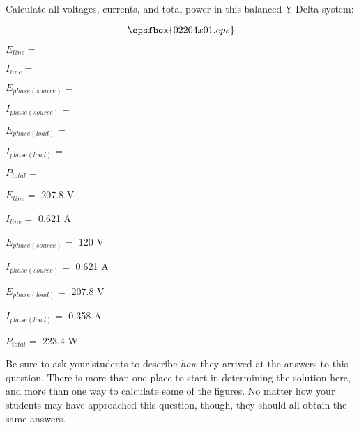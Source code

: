 

Calculate all voltages, currents, and total power in this balanced Y-Delta system:

$$\epsfbox{02204x01.eps}$$

\medskip
\item{} $E_{line} =$
\item{} $I_{line} =$
\item{} $E_{phase(source)} =$
\item{} $I_{phase(source)} =$
\item{} $E_{phase(load)} =$
\item{} $I_{phase(load)} =$
\item{} $P_{total} =$
\medskip







\medskip
\item{} $E_{line} =$ 207.8 V
\item{} $I_{line} =$ 0.621 A
\item{} $E_{phase(source)} =$ 120 V
\item{} $I_{phase(source)} =$ 0.621 A
\item{} $E_{phase(load)} =$ 207.8 V
\item{} $I_{phase(load)} =$ 0.358 A
\item{} $P_{total} =$ 223.4 W
\medskip







Be sure to ask your students to describe {\it how} they arrived at the answers to this question.  There is more than one place to start in determining the solution here, and more than one way to calculate some of the figures.  No matter how your students may have approached this question, though, they should all obtain the same answers.





